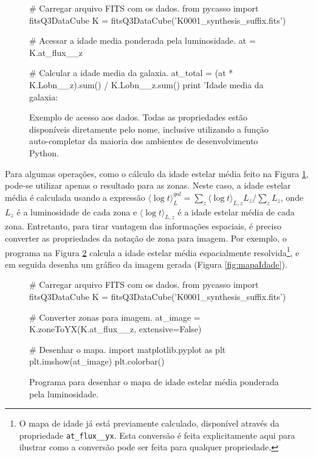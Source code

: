 \begin{figure}
\begin{python}
# Carregar arquivo FITS com os dados.
from pycasso import fitsQ3DataCube
K = fitsQ3DataCube('K0001_synthesis_suffix.fits')

# Acessar a idade media ponderada pela luminosidade.
at = K.at_flux__z

# Calcular a idade media da galaxia.
at_total = (at * K.Lobn__z).sum() / K.Lobn__z.sum()
print 'Idade media da galaxia: %
\end{python}
	\caption[Exemplo de programa utilizando PyCASSO]
	{Exemplo de acesso aos dados. Todas as propriedades estão disponíveis
	diretamente pelo nome, inclusive utilizando a função auto-completar da maioria
	dos ambientes de desenvolvimento Python.}
	\label{fig:dataAccess}
\end{figure}

Para algumas operações, como o cálculo da idade estelar média feito na Figura
\ref{fig:dataAccess}, pode-se utilizar apenas o resultado para as zonas. Neste
caso, a idade estelar média é calculada usando a expressão $\langle \log t
\rangle^{gal}_L = \sum_z \langle \log t \rangle_{L,z} L_z / \sum_z L_z$, onde
$L_z$ é a luminosidade de cada zona e $\langle \log t \rangle_{L,z}$ é a idade
estelar média de cada zona. Entretanto, para tirar vantagem das informações
espaciais, é preciso converter as propriedades da notação de zona para imagem.
Por exemplo, o programa na Figura \ref{fig:programaMapaIdade} calcula a idade
estelar média espacialmente resolvida\footnote{O mapa de idade já está
previamente calculado, disponível através da propriedade
\texttt{at\_flux\_\_yx}. Esta conversão é feita explicitamente aqui para
ilustrar como a conversão pode ser feita para qualquer propriedade.}, e em
seguida desenha um gráfico da imagem gerada (Figura \ref{fig:mapaIdade}).

\begin{figure}
\begin{python}
# Carregar arquivo FITS com os dados.
from pycasso import fitsQ3DataCube
K = fitsQ3DataCube('K0001_synthesis_suffix.fits')

# Converter zonas para imagem.
at_image = K.zoneToYX(K.at_flux__z, extensive=False)

# Desenhar o mapa.
import matplotlib.pyplot as plt
plt.imshow(at_image)
plt.colorbar()
\end{python}
	\caption[Programa para desenhar o mapa da idade estelar média] {Programa
	para desenhar o mapa de idade estelar média ponderada pela luminosidade.}
	\label{fig:programaMapaIdade}
\end{figure}

